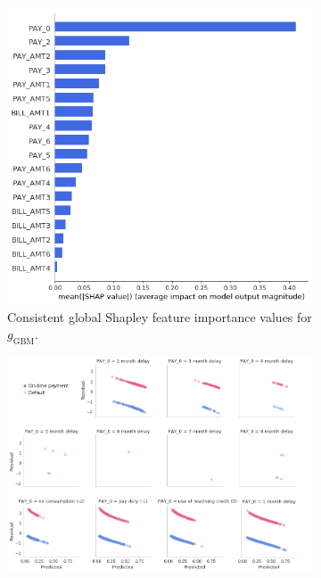 \documentclass{article}
\begin{document}
\begin{figure}[htb!]
	\begin{subfigure}{.4\textwidth}
  		\includegraphics[height=1.17\linewidth, width=1.05\linewidth]{img/global_shap.png}
  		\caption{Consistent global Shapley feature importance values for $g_{\text{GBM}}$.}
  		\label{fig:global_shap}
	\end{subfigure}\hspace{10pt}
	\begin{subfigure}{.5\textwidth}
		\includegraphics[width=1.28\linewidth]{img/resid.png}

\end{subfigure}
\end{figure}
\end{document}
